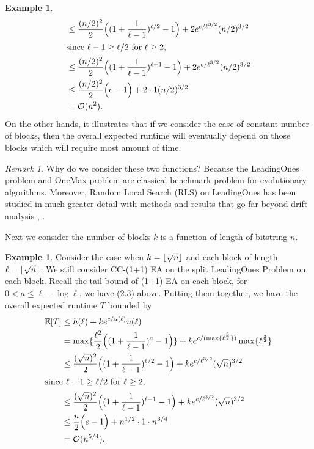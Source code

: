 \documentclass[a4paper,11pt]{report}
\DeclarePairedDelimiter\floor{\lfloor}{\rfloor}
\theoremstyle{plain} %
\theoremstyle{definition} %
\newtheorem{eg}[thm]{Example}
\theoremstyle{remark} %
\newtheorem*{rem}{Remark}
\begin{document}
\begin{eg}
\begin{align*}
                  &\leq  \frac{(n/2) ^2}{2} \Big( (1+\frac{1}{\ell-1})^{\ell /2}  -1\Big)+ 2e^{c/\ell ^{3/2} } (n/2)^{3/2}  \\
                  \intertext{since $\ell -1 \geq \ell /2$ for $\ell \geq 2$,}
                  & \leq \frac{(n/2) ^2}{2} \Big( (1+\frac{1}{\ell-1})^{\ell -1}  -1\Big)+ 2e^{c/\ell ^{3/2} } (n/2)^{3/2} \\
                  & \leq \frac{(n/2) ^2}{2} \Big( e  -1\Big)+ 2 \cdot 1 (n/2)^{3/2} \\
                  & =\mathcal{O}(n^2).
\end{align*}
On the other hands, it illustrates that if we consider the case of constant number of blocks, then the overall expected runtime will eventually depend on those blocks which will require most amount of time. 
\end{eg}

\begin{rem}
Why do we consider these two functions? Because the {\sc LeadingOnes} problem and {\sc OneMax} problem are classical benchmark problem for evolutionary algorithms. Moreover, Random Local Search (RLS) on {\sc LeadingOnes} has been studied in much greater detail with methods and results that go far beyond drift analysis \citep{doerr_impact_2014}, \citep{ladret_asymptotic_2003}. 
\end{rem}

\par Next we consider the number of blocks $k$ is a function of length of bitstring $n$. 
\begin{eg} Consider the case when $k=\floor{\sqrt{n}}$ and each block of length $\ell = \floor{\sqrt{n}}$. We still consider CC-(1+1) EA on the split {\sc LeadingOnes} Problem on each block. Recall the tail bound of (1+1) EA on each block, for $0<a\leq \ell -\log \ell$, we have (2.3) above. Putting them together, we have the overall expected runtime $T$ bounded by
\begin{align*}
    \mathbb{E}[T] &\leq h(\ell)+ke^{c/u(\ell)}u(\ell) \\
                  & =\max \{ \frac{\ell ^2}{2} \Big( (1+\frac{1}{\ell-1})^a  -1\Big) \} + ke^{c/(\max \{ \ell^{\frac{3}{2}} \})} \max \{\ell^{\frac{3}{2}}  \} \\
                  &\leq  \frac{(\sqrt{n}) ^2}{2} \Big( (1+\frac{1}{\ell-1})^{\ell /2}  -1\Big)+ ke^{c/\ell ^{3/2} } (\sqrt{n})^{3/2}  \\
                  \intertext{since $\ell -1 \geq \ell /2$ for $\ell \geq 2$,}
                  & \leq \frac{(\sqrt{n}) ^2}{2} \Big( (1+\frac{1}{\ell-1})^{\ell -1}  -1\Big)+ ke^{c/\ell ^{3/2} } (\sqrt{n})^{3/2} \\
                  & \leq \frac{n}{2} \Big( e  -1\Big)+ n^{1/2} \cdot 1 \cdot n^{3/4} \\
                  & =\mathcal{O}(n^{5/4}).
\end{align*}
\end{eg}
\end{document}
